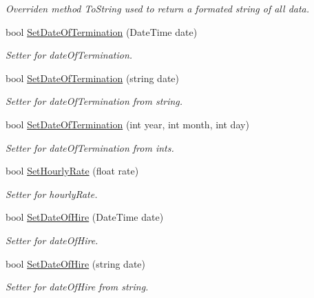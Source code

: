 \begin{DoxyCompactItemize}
\begin{DoxyCompactList}\small\item\em Overriden method To\+String used to return a formated string of all data. \end{DoxyCompactList}\item 
bool \hyperlink{class_all_employees_1_1_parttime_employee_a13b87ed00ebf4f834d6c9ff5b3051ca0}{Set\+Date\+Of\+Termination} (Date\+Time date)
\begin{DoxyCompactList}\small\item\em Setter for date\+Of\+Termination. \end{DoxyCompactList}\item 
bool \hyperlink{class_all_employees_1_1_parttime_employee_a305894433e372ba1511999889eebd7f0}{Set\+Date\+Of\+Termination} (string date)
\begin{DoxyCompactList}\small\item\em Setter for date\+Of\+Termination from string. \end{DoxyCompactList}\item 
bool \hyperlink{class_all_employees_1_1_parttime_employee_ad1738c15831d445694a56cf31eaf1e65}{Set\+Date\+Of\+Termination} (int year, int month, int day)
\begin{DoxyCompactList}\small\item\em Setter for date\+Of\+Termination from ints. \end{DoxyCompactList}\item 
bool \hyperlink{class_all_employees_1_1_parttime_employee_a13f02bfe441ed7b6f809f8ed5468bf7f}{Set\+Hourly\+Rate} (float rate)
\begin{DoxyCompactList}\small\item\em Setter for hourly\+Rate. \end{DoxyCompactList}\item 
bool \hyperlink{class_all_employees_1_1_parttime_employee_aa57cd09d4828cb5628f8b6200cdceeac}{Set\+Date\+Of\+Hire} (Date\+Time date)
\begin{DoxyCompactList}\small\item\em Setter for date\+Of\+Hire. \end{DoxyCompactList}\item 
bool \hyperlink{class_all_employees_1_1_parttime_employee_a7b1681699133e08b3c11900b73d757ef}{Set\+Date\+Of\+Hire} (string date)
\begin{DoxyCompactList}\small\item\em Setter for date\+Of\+Hire from string. \end{DoxyCompactList}\item 

\end{DoxyCompactItemize}
